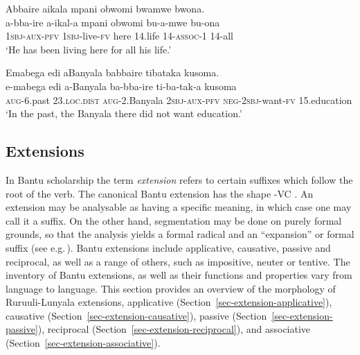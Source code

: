\ea  \label{ex-complexTA}
\begin{xlist}
\ex	\label{ex-complexTA-pos}
	\glll  Abbaire aikala mpani obwomi bwamwe bwona.\\
		a-bba-ire a-ikal-a mpani obwomi bu-a-mwe bu-ona\\
		\textsc{1sbj}-\textsc{aux}-\textsc{pfv} \textsc{1sbj}-live-\textsc{fv} here 14.life 14-\textsc{assoc}-1 14-all\\
\glt ‘He has been living here for all his life.' 

\ex \label{ex-complexTA-neg}
 
	\glll	Emabega edi aBanyala babbaire tibataka kusoma.\\
	  e-mabega edi a-Banyala ba-bba-ire ti-ba-tak-a kusoma\\
		\textsc{aug}-6.past 23.\textsc{loc}.\textsc{dist} \textsc{aug}-2.Banyala \textsc{2sbj}-\textsc{aux}-\textsc{pfv} \textsc{neg}-\textsc{2sbj}-want-\textsc{fv} 15.education\\
\glt  `In the past, the Banyala there did not want education.’
\end{xlist}
\z

\subsection{Extensions}\label{sec-morph-verb-extensions}

In Bantu scholarship the term \textit{extension} refers to certain suffixes which follow the root of the verb. 
The canonical Bantu extension has the shape -VC \citep[173]{Schadebergetal2019Bantu}. 
An extension may be analysable as having a specific meaning, in which case one may call it a suffix. 
On the other hand, segmentation may be done on purely formal grounds, so that the analysis yields a formal radical and an “expansion” or formal suffix (see e.g.\,\citealt[\,172–173]{Schadebergetal2019Bantu}). 
Bantu extensions include applicative, causative, passive and reciprocal, as well as a range of others, such as impositive, neuter or tentive.
The inventory of Bantu extensions, as well as their functions and properties vary from language to language. 
This section provides an overview of the morphology of Ru\-ruu\-li\hyp{}Lu\-nya\-la extensions, \viz applicative (Section~\ref{sec-extension-applicative}), causative (Section~\ref{sec-extension-causative}), passive (Section~\ref{sec-extension-passive}), reciprocal (Section~\ref{sec-extension-reciprocal}), and associative (Section~\ref{sec-extension-associative}). 

